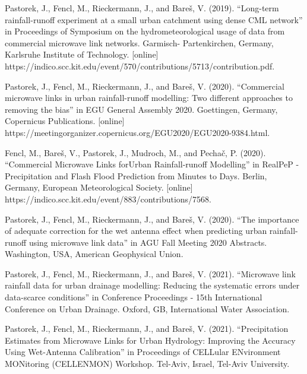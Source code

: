 \documentclass{ctuthesis}\usepackage[]{graphicx}\usepackage[]{color}
\begin{document}
\begin{description}
\item Pastorek, J., Fencl, M., Rieckermann, J., and Bareš, V. (2019). “Long-term rainfall-runoff experiment at a small urban catchment using dense CML network” in Proceedings of Symposium on the hydrometeorological usage of data from commercial microwave link networks. Garmisch-
Partenkirchen, Germany, Karlsruhe Institute of Technology. [online] \newline https://indico.scc.kit.edu/event/570/contributions/5713/contribution.pdf.

\item Pastorek, J., Fencl, M., Rieckermann, J., and Bareš, V. (2020). “Commercial microwave links in urban rainfall-runoff modelling: Two different approaches to removing the bias” in EGU General Assembly 2020. Goettingen, Germany, Copernicus Publications. [online]  \newline https://meetingorganizer.copernicus.org/EGU2020/EGU2020-9384.html.

\item Fencl, M., Bareš, V., Pastorek, J., Mudroch, M., and Pechač, P. (2020). “Commercial Microwave Links forUrban Rainfall-runoff Modelling” in RealPeP - Precipitation and Flash Flood Prediction from Minutes to Days. Berlin, Germany, European Meteorological Society. [online]  \newline https://indico.scc.kit.edu/event/883/contributions/7568.

\item Pastorek, J., Fencl, M., Rieckermann, J., and Bareš, V. (2020). “The importance of adequate correction for the wet antenna effect when predicting urban rainfall-runoff using microwave link data” in AGU Fall Meeting 2020 Abstracts. Washington, USA, American Geophysical Union.

\item Pastorek, J., Fencl, M., Rieckermann, J., and Bareš, V. (2021). “Microwave link rainfall data for urban drainage modelling: Reducing the systematic errors under data-scarce conditions” in Conference Proceedings - 15th International Conference on Urban Drainage. Oxford, GB, International Water Association.

\item Pastorek, J., Fencl, M., Rieckermann, J., and Bareš, V. (2021). “Precipitation Estimates from Microwave Links for Urban Hydrology: Improving the Accuracy Using Wet-Antenna Calibration” in Proceedings of CELLular ENvironment MONitoring (CELLENMON) Workshop. Tel-Aviv, Israel, Tel-Aviv University.

\end{description}


\FloatBarrier
{}

        
        
\end{document}
